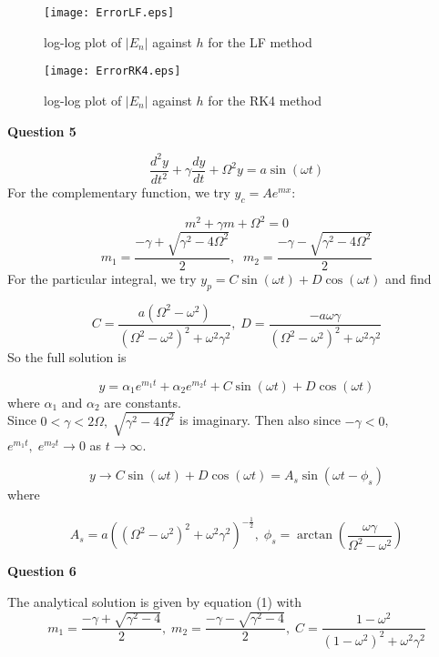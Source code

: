 \documentclass[14pt]{extarticle}
\begin{document}
\begin{figure}[htp!]
\centering
\texttt{[image: ErrorLF.eps]}
\caption{log-log plot of $|E_n|$ against $h$ for the LF method}
\label{figure:4}
\end{figure}

\begin{figure}[htp!]
\centering
\texttt{[image: ErrorRK4.eps]}
\caption{log-log plot of $|E_n|$ against $h$ for the RK4 method}
\label{figure:5}
\end{figure}

\pagebreak
\begin{center}
\textbf{Question 5}
\end{center}
\vspace{-5mm}

\[\frac{d^2y}{dt^2} + \gamma\frac{dy}{dt} + \Omega^2y = a\sin(\omega t)\]
For the complementary function, we try $y_c = Ae^{mx}$:

\[m^2+\gamma m+\Omega^2 = 0\]
\[m_1 = \displaystyle{\frac{-\gamma + \sqrt{\gamma^2 -4\Omega^2}}{2}},\;\; m_2 = \displaystyle{\frac{-\gamma - \sqrt{\gamma^2 -4\Omega^2}}{2}}\]
For the particular integral, we try $y_p = C\sin(\omega t) +D\cos(\omega t)$ and find

\[C = \displaystyle{\frac{a(\Omega^2 - \omega^2)}{(\Omega^2 - \omega^2)^2 +\omega^2 \gamma^2}},\; D = \displaystyle{\frac{-a\omega \gamma}{(\Omega^2 - \omega^2)^2 +\omega^2 \gamma^2}}\]
So the full solution is 

\begin{equation} \label{eq:1}
y = \displaystyle{\alpha_1e^{m_1t}+\alpha_2e^{m_2t}+C\sin(\omega t)+D\cos(\omega t)}
\end{equation}
where $\alpha_1$ and $\alpha_2$ are constants.\\

\noindent Since $0<\gamma<2\Omega,\; \sqrt{\gamma^2 -4\Omega^2}$ is imaginary. Then also since $-\gamma<0$, $e^{m_1t},\; e^{m_2t} \rightarrow 0$  as $t \rightarrow \infty$. 

\[y \rightarrow C\sin(\omega t)+D\cos(\omega t) = A_s\sin(\omega t - \phi_s)\]
where

\[A_s = a\left((\Omega^2-\omega^2)^2+\omega^2\gamma^2\right)^{-\frac{1}{2}},\; \phi_s =\arctan\left(\frac{\omega\gamma}{\Omega^2-\omega^2}\right)\]

\begin{center}
\textbf{Question 6}
\end{center}
The analytical solution is given by equation (1) with 
\[m_1 = \frac{-\gamma + \sqrt{\gamma^2 -4}}{2},\; m_2 = \frac{-\gamma - \sqrt{\gamma^2 -4}}{2},\; C = \frac{1 - \omega^2}{(1 - \omega^2)^2 +\omega^2 \gamma^2}\]
\end{document}
